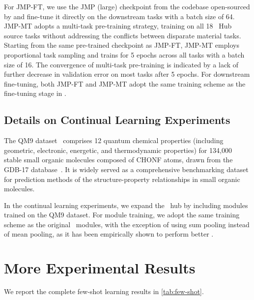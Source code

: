 For JMP-FT, we use the JMP (large) checkpoint from the codebase open-sourced by \citet{shoghi2023molecules} and fine-tune it directly on the downstream tasks with a batch size of 64. JMP-MT adopts a multi-task pre-training strategy, training on all 18 \name \ Hub source tasks without addressing the conflicts between disparate material tasks. Starting from the same pre-trained checkpoint as JMP-FT, JMP-MT employs proportional task sampling and trains for 5 epochs across all tasks with a batch size of 16. The convergence of multi-task pre-training is indicated by a lack of further decrease in validation error on most tasks after 5 epochs. For downstream fine-tuning, both JMP-FT and JMP-MT adopt the same training scheme as the fine-tuning stage in \name.


\subsection{Details on Continual Learning Experiments}
\label{appendix:cl}
The QM9 dataset~\citep{ramakrishnan2014quantum} comprises 12 quantum chemical properties (including geometric, electronic, energetic, and thermodynamic properties) for 134,000 stable small organic molecules composed of CHONF atoms, drawn from the GDB-17 database~\citep{ruddigkeit2012enumeration}. It is widely served as a comprehensive benchmarking dataset for prediction methods of the structure-property relationships in small organic molecules.

In the continual learning experiments, we expand the \name \ hub by including modules trained on the QM9 dataset. For module training, we adopt the same training scheme as the original \name \ modules, with the exception of using sum pooling instead of mean pooling, as it has been empirically shown to perform better \citep{shoghi2023molecules}.

\section{More Experimental Results}
We report the complete few-shot learning results in \cref{tab:few-shot}.

